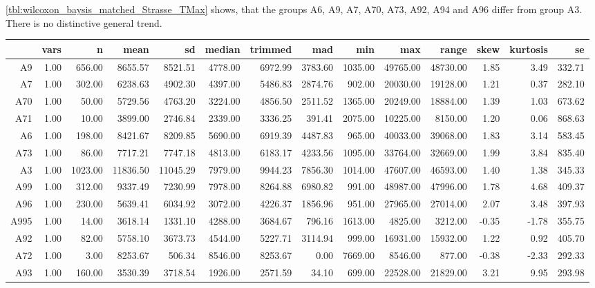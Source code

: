 \cref{tbl:wilcoxon_baysis_matched_Strasse_TMax} shows, that the groups A6, A9, A7, A70, A73, A92, A94 and A96 differ from group A3. There is no distinctive general trend.
\begin{table}[ht!]
	\tiny
	\centering
  \begin{tabular}{rrrrrrrrrrrrrr}
    \hline
    & vars & n & mean & sd & median & trimmed & mad & min & max & range & skew & kurtosis & se \\ 
    \hline
    A9   & 1.00 & 656.00 & 8655.57 & 8521.51 & 4778.00 & 6972.99 & 3783.60 & 1035.00 & 49765.00 & 48730.00 & 1.85 & 3.49 & 332.71 \\ 
    A7   & 1.00 & 302.00 & 6238.63 & 4902.30 & 4397.00 & 5486.83 & 2874.76 & 902.00 & 20030.00 & 19128.00 & 1.21 & 0.37 & 282.10 \\ 
    A70  & 1.00 & 50.00 & 5729.56 & 4763.20 & 3224.00 & 4856.50 & 2511.52 & 1365.00 & 20249.00 & 18884.00 & 1.39 & 1.03 & 673.62 \\ 
    A71  & 1.00 & 10.00 & 3899.00 & 2746.84 & 2339.00 & 3336.25 & 391.41 & 2075.00 & 10225.00 & 8150.00 & 1.20 & 0.06 & 868.63 \\ 
    A6   & 1.00 & 198.00 & 8421.67 & 8209.85 & 5690.00 & 6919.39 & 4487.83 & 965.00 & 40033.00 & 39068.00 & 1.83 & 3.14 & 583.45 \\ 
    A73  & 1.00 & 86.00 & 7717.21 & 7747.18 & 4813.00 & 6183.17 & 4233.56 & 1095.00 & 33764.00 & 32669.00 & 1.99 & 3.84 & 835.40 \\ 
    A3   & 1.00 & 1023.00 & 11836.50 & 11045.29 & 7979.00 & 9944.23 & 7856.30 & 1014.00 & 47607.00 & 46593.00 & 1.40 & 1.38 & 345.33 \\ 
    A99  & 1.00 & 312.00 & 9337.49 & 7230.99 & 7978.00 & 8264.88 & 6980.82 & 991.00 & 48987.00 & 47996.00 & 1.78 & 4.68 & 409.37 \\ 
    A96  & 1.00 & 230.00 & 5639.41 & 6034.92 & 3072.00 & 4226.37 & 1856.96 & 951.00 & 27965.00 & 27014.00 & 2.07 & 3.48 & 397.93 \\ 
    A995 & 1.00 & 14.00 & 3618.14 & 1331.10 & 4288.00 & 3684.67 & 796.16 & 1613.00 & 4825.00 & 3212.00 & -0.35 & -1.78 & 355.75 \\ 
    A92  & 1.00 & 82.00 & 5758.10 & 3673.73 & 4544.00 & 5227.71 & 3114.94 & 999.00 & 16931.00 & 15932.00 & 1.22 & 0.92 & 405.70 \\ 
    A72  & 1.00 & 3.00 & 8253.67 & 506.34 & 8546.00 & 8253.67 & 0.00 & 7669.00 & 8546.00 & 877.00 & -0.38 & -2.33 & 292.33 \\ 
    A93  & 1.00 & 160.00 & 3530.39 & 3718.54 & 1926.00 & 2571.59 & 34.10 & 699.00 & 22528.00 & 21829.00 & 3.21 & 9.95 & 293.98 \\ 

\end{tabular}
\end{table}

